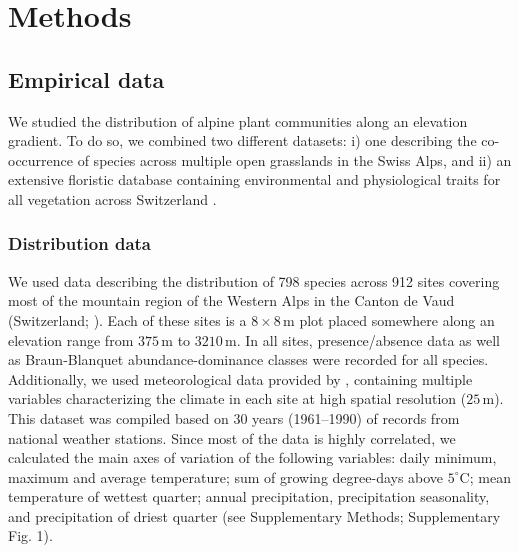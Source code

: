 \documentclass[11pt, a4paper]{article}
\begin{document}


 
\section*{Methods}
\subsection*{Empirical data}
We studied the distribution of alpine plant communities along an elevation gradient. To do so, we combined two different datasets: i) one describing the co-occurrence of species across multiple open grasslands in the Swiss Alps, and ii) an extensive floristic database containing environmental and physiological traits for all vegetation across Switzerland \citep{landoltFloraIndicativaOkologische2010}. 

\subsubsection*{Distribution data}
We used data describing the distribution of 798 species across 912 sites covering most of the mountain region of the Western Alps in the Canton de Vaud (Switzerland; \citealt{scherrerEcologicalIndicatorValues2019}). Each of these sites is a $8\times 8\,\text{m}$ plot placed somewhere along an elevation range from $375\,\text{m}$ to $3210\,\text{m}$. In all sites, presence/absence data as well as Braun-Blanquet abundance-dominance classes were recorded for all species. Additionally, we used meteorological data provided by \citet{scherrerEcologicalIndicatorValues2019}, containing multiple variables characterizing the climate in each site at high spatial resolution ($25\,\text{m}$). This dataset was compiled based on 30 years (1961–1990) of records from national weather stations. Since most of the data is highly correlated, we calculated the main axes of variation of the following variables: daily minimum, maximum and average temperature; sum of growing degree-days above $5^{\circ}\text{C}$; mean temperature of wettest quarter; annual precipitation, precipitation seasonality, and precipitation of driest quarter (see Supplementary Methods; Supplementary Fig. 1). %
\end{document}
